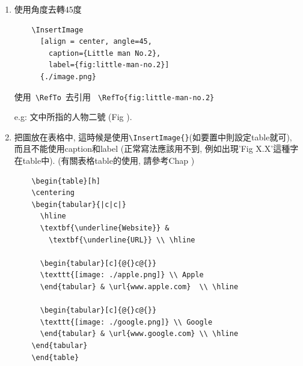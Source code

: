 \begin{enumerate}
{    之後可以使用\verb| \RefTo |去引用 \verb| \RefTo{fig:little-man-no.1} |

    e.g: 文中所指的人物一號 (Fig ).
  } %

  \item
  {
    使用角度去轉45度
    \begin{verbatim}
    \InsertImage
      [align = center, angle=45,
        caption={Little man No.2},
        label={fig:little-man-no.2}]
      {./image.png}
    \end{verbatim}

    使用\verb| \RefTo |去引用 \verb| \RefTo{fig:little-man-no.2} |

    e.g: 文中所指的人物二號 (Fig ).
  } %

  \newpage
  \item
  {
    把圖放在表格中, 這時候是使用\verb|\InsertImage{}|(如要置中則設定table就可), 而且不能使用caption和label (正常寫法應該用不到, 例如出現'Fig X.X'這種字在table中). (有關表格table的使用, 請參考Chap )

    \begin{verbatim}
    \begin{table}[h]
    \centering
    \begin{tabular}{|c|c|}
      \hline
      \textbf{\underline{Website}} &
        \textbf{\underline{URL}} \\ \hline

      \begin{tabular}[c]{@{}c@{}}
      \texttt{[image: ./apple.png]} \\ Apple
      \end{tabular} & \url{www.apple.com}  \\ \hline

      \begin{tabular}[c]{@{}c@{}}
      \texttt{[image: ./google.png]} \\ Google
      \end{tabular} & \url{www.google.com} \\ \hline
    \end{tabular}
    \end{table}
    \end{verbatim}

}
\end{enumerate}

